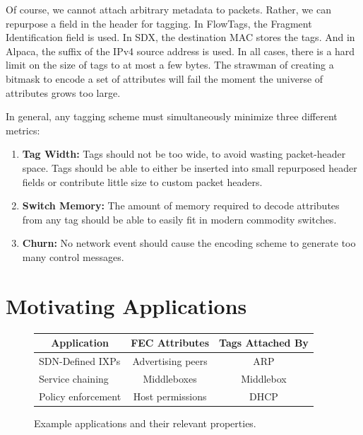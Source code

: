 Of course, we cannot attach arbitrary metadata to packets. Rather, we can
repurpose a field in the header for tagging. In FlowTags, the Fragment
Identification field is used. In SDX, the destination MAC stores the tags. And
in Alpaca, the suffix of the IPv4 source address is used. In all cases, there is
a hard limit on the size of tags to at most a few bytes.  The strawman of
creating a bitmask to encode a set of attributes will fail the moment the
universe of attributes grows too large.


In general, any tagging scheme must simultaneously minimize three different
metrics: \begin{enumerate} \item \textbf{Tag Width:} Tags should not be too
wide, to avoid wasting packet-header space.  Tags should be able to either be
inserted into small repurposed header fields or contribute little size to custom
packet headers.  \item \textbf{Switch Memory:} The amount of memory required to
decode attributes from any tag should be able to easily fit in modern commodity
switches.  \item \textbf{Churn:} No network event should cause the encoding
scheme to generate too many control messages.  \end{enumerate}


\section{Motivating Applications}\label{sec:motivation} 

\begin{figure} \small
\begin{center} \begin{tabular}{|l|c|c|} \hline \multicolumn{1}{|c|}{\bf
Application} & \multicolumn{1}{c|}{\bf FEC Attributes} & \multicolumn{1}{c|}{\bf
Tags Attached By}\\ \hline SDN-Defined IXPs & Advertising peers & ARP \\ \hline
Service chaining & Middleboxes & Middlebox \\ \hline Policy enforcement & Host
permissions & DHCP \\ \hline \end{tabular} \end{center} \caption{Example
applications and their relevant properties. } \label{tab:applications}
\end{figure}


